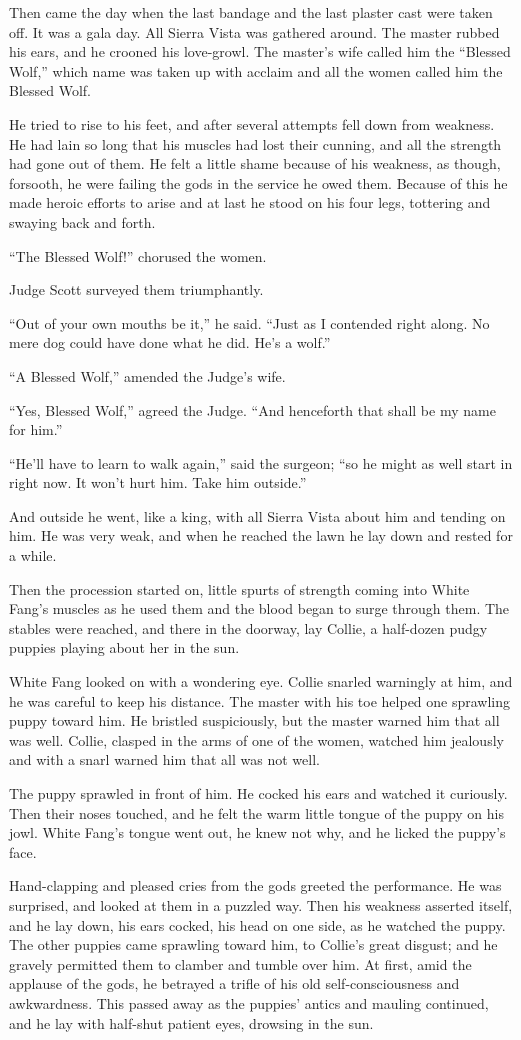 \documentclass[10pt]{book}
\begin{document}
Then came the day when the last bandage and the last plaster cast were
taken off. It was a gala day. All Sierra Vista was gathered around. The
master rubbed his ears, and he crooned his love-growl. The master’s
wife called him the “Blessed Wolf,” which name was taken up with
acclaim and all the women called him the Blessed Wolf.

He tried to rise to his feet, and after several attempts fell down from
weakness. He had lain so long that his muscles had lost their cunning,
and all the strength had gone out of them. He felt a little shame
because of his weakness, as though, forsooth, he were failing the gods
in the service he owed them. Because of this he made heroic efforts to
arise and at last he stood on his four legs, tottering and swaying back
and forth.

“The Blessed Wolf!” chorused the women.

Judge Scott surveyed them triumphantly.

“Out of your own mouths be it,” he said. “Just as I contended right
along. No mere dog could have done what he did. He’s a wolf.”

“A Blessed Wolf,” amended the Judge’s wife.

“Yes, Blessed Wolf,” agreed the Judge. “And henceforth that shall be my
name for him.”

“He’ll have to learn to walk again,” said the surgeon; “so he might as
well start in right now. It won’t hurt him. Take him outside.”

And outside he went, like a king, with all Sierra Vista about him and
tending on him. He was very weak, and when he reached the lawn he lay
down and rested for a while.

Then the procession started on, little spurts of strength coming into
White Fang’s muscles as he used them and the blood began to surge
through them. The stables were reached, and there in the doorway, lay
Collie, a half-dozen pudgy puppies playing about her in the sun.

White Fang looked on with a wondering eye. Collie snarled warningly at
him, and he was careful to keep his distance. The master with his toe
helped one sprawling puppy toward him. He bristled suspiciously, but
the master warned him that all was well. Collie, clasped in the arms of
one of the women, watched him jealously and with a snarl warned him
that all was not well.

The puppy sprawled in front of him. He cocked his ears and watched it
curiously. Then their noses touched, and he felt the warm little tongue
of the puppy on his jowl. White Fang’s tongue went out, he knew not
why, and he licked the puppy’s face.

Hand-clapping and pleased cries from the gods greeted the performance.
He was surprised, and looked at them in a puzzled way. Then his
weakness asserted itself, and he lay down, his ears cocked, his head on
one side, as he watched the puppy. The other puppies came sprawling
toward him, to Collie’s great disgust; and he gravely permitted them to
clamber and tumble over him. At first, amid the applause of the gods,
he betrayed a trifle of his old self-consciousness and awkwardness.
This passed away as the puppies’ antics and mauling continued, and he
lay with half-shut patient eyes, drowsing in the sun.
\end{document}
